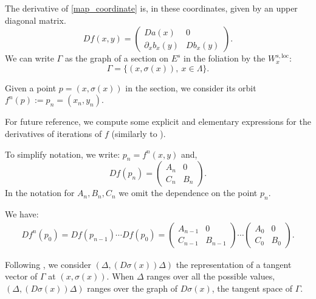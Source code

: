 \documentclass[11pt]{amsart}
\theoremstyle{definition}
\theoremstyle{remark}
\numberwithin{equation}{section}
\begin{document}
The derivative of \eqref{map_coordinate} is, in these coordinates,
given by an upper diagonal matrix.
\[
Df(x,y) = \begin{pmatrix} Da(x) & 0  \\
  \partial_x b_x(y)  &  D b_x(y)
  \end{pmatrix} .
\]
We  can write $\Gamma$ as the graph of a section on $E^s$ in the foliation by the $W^{s,\textrm{loc}}_x$:
\[
\Gamma = \{(x,\sigma(x)), \ x\in \Lambda \} .
\]

Given a point $p = (x, \sigma(x) )$ in the section, we consider
its orbit $f^n(p):=p_n =(x_n,y_n)$.


\smallskip
For future reference, we compute some explicit
and elementary expressions for the  derivatives of iterations of $f$
(similarly to \cite[Proposition 15]{DLS08}).


To simplify notation, we write:
$p_n = f^n( x,y)$ and,
\[ Df(p_n) =  \begin{pmatrix} A_n  & 0 \\
  C_n  &  B_n
\end{pmatrix} .
\]
In the notation for $A_n, B_n,C_n$ we omit
the dependence on the point $p_n$.


We have:
\[
\begin{split}
  Df^n(p_0)  = Df(p_{n-1}) \cdots Df(p_0)  =
  \begin{pmatrix} A_{n-1}  &  0 \\
    C_{n-1} &  B_{n-1}
  \end{pmatrix} \cdots
  \begin{pmatrix} A_{0}  & 0\\
    C_{0} &  B_{0}
    \end{pmatrix} .
  \end{split}
 \]


Following \cite{Hadamard01,Hasselblatt17},
we consider $(\Delta,(D\sigma(x)) \Delta)$ the representation of
a tangent vector of $\Gamma$ at $(x, \sigma(x))$.
When $\Delta$ ranges over all the possible values,
$(\Delta,(D\sigma(x)) \Delta)$ ranges over the graph of $D\sigma(x)$,
the tangent  space of $\Gamma$.
\end{document}
